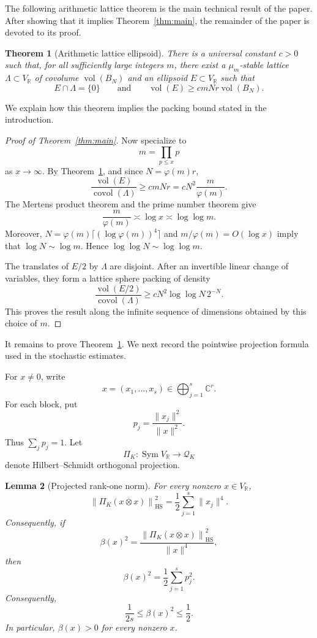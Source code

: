 \documentclass[11pt]{article}
\newtheorem{theorem}{Theorem}[section]
\newtheorem{lemma}[theorem]{Lemma}
\theoremstyle{remark}
\newcommand{\R}{\mathbb R}
\newcommand{\C}{\mathbb C}
\newcommand{\vol}{\operatorname{vol}}
\newcommand{\covol}{\operatorname{covol}}
\newcommand{\Sym}{\operatorname{Sym}}
\newcommand{\HS}{\operatorname{HS}}
\begin{document}
The following arithmetic lattice theorem is the main technical result of the
paper.  After showing that it implies Theorem~\ref{thm:main}, the remainder of
the paper is devoted to its proof.

\begin{theorem}[Arithmetic lattice ellipsoid]\label{thm:arithmetic-lattice}
There is a universal constant $c>0$ such that,
for all sufficiently large integers $m$, there exist a $\mu_m$-stable lattice
$\Lambda\subset V_\R$ of covolume $\vol(B_N)$ and an ellipsoid $E\subset V_\R$
such that
\[
        E\cap\Lambda=\{0\}
        \qquad\text{and}\qquad
        \vol(E)\ge cmNr\vol(B_N).
\]
\end{theorem}

We explain how this theorem implies the packing bound stated in the
introduction.

\begin{proof}[Proof of Theorem~\ref{thm:main}]
Now specialize to
\[
        m=\prod_{p\le x}p
\]
as $x\to\infty$.  By Theorem~\ref{thm:arithmetic-lattice}, and since
$N=\varphi(m)r$,
\[
        \frac{\vol(E)}{\covol(\Lambda)}
        \ge cmNr
        =cN^2\frac{m}{\varphi(m)}.
\]
The Mertens product theorem and the prime number theorem give
\[
        \frac{m}{\varphi(m)}
        \asymp\log x
        \asymp\log\log m.
\]
Moreover,
$N=\varphi(m)\lceil(\log\varphi(m))^4\rceil$ and
$m/\varphi(m)=O(\log x)$ imply that
$\log N\sim\log m$.  Hence $\log\log N\sim\log\log m$.

The translates of $E/2$ by $\Lambda$ are disjoint.  After an invertible linear
change of variables, they form a lattice sphere packing of density
\[
        \frac{\vol(E/2)}{\covol(\Lambda)}
        \ge cN^2\log\log N\,2^{-N}.
\]
This proves the result along the infinite sequence of dimensions obtained by
this choice of $m$.
\end{proof}

It remains to prove Theorem~\ref{thm:arithmetic-lattice}.  We next record the
pointwise projection formula used in the stochastic estimates.

For $x\ne0$, write
\[
        x=(x_1,\dots,x_s)\in\bigoplus_{j=1}^s\C^r.
\]
For each block, put
\[
        p_j=\frac{\|x_j\|^2}{\|x\|^2}.
\]
Thus $\sum_jp_j=1$.  Let
\[
        \Pi_K:\Sym V_\R\to\mathcal Q_K
\]
denote Hilbert--Schmidt orthogonal projection.

\begin{lemma}[Projected rank-one norm]\label{lem:projection}
For every nonzero $x\in V_\R$,
\[
        \left\|\Pi_K(x\otimes x)\right\|_{\HS}^2
        =\frac12\sum_{j=1}^s\|x_j\|^4.
\]
Consequently, if
\[
        \beta(x)^2=
        \frac{\left\|\Pi_K(x\otimes x)\right\|_{\HS}^2}{\|x\|^4},
\]
then
\[
        \beta(x)^2=\frac12\sum_{j=1}^s p_j^2.
\]
Consequently,
\[
        \frac1{2s}\le \beta(x)^2\le\frac12.
\]
In particular, $\beta(x)>0$ for every nonzero $x$.
\end{lemma}
\end{document}
